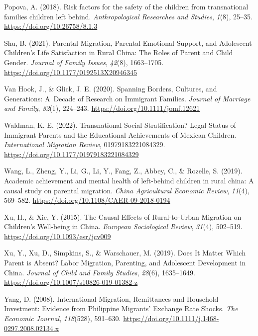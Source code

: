 \documentclass[
  man,floatsintext]{apa7}
\newlength{\cslhangindent}
\newlength{\cslentryspacingunit} %
\newenvironment{CSLReferences}[2] %
 {%
  \setlength{\parindent}{0pt}
  \ifodd #1
  \let\oldpar\par
  \def\par{\hangindent=\cslhangindent\oldpar}
  \fi
  \setlength{\parskip}{#2\cslentryspacingunit}
 }%
 {}
\begin{document}
\begin{CSLReferences}{1}{0}
\leavevmode{}%
Popova, A. (2018). Risk factors for the safety of the children from transnational families children left behind. \emph{Anthropological Researches and Studies}, \emph{1}(8), 25--35. \url{https://doi.org/10.26758/8.1.3}

\leavevmode{}%
Shu, B. (2021). Parental Migration, Parental Emotional Support, and Adolescent Children{'}s Life Satisfaction in Rural China: The Roles of Parent and Child Gender. \emph{Journal of Family Issues}, \emph{42}(8), 1663--1705. \url{https://doi.org/10.1177/0192513X20946345}

\leavevmode{}%
Van Hook, J., \& Glick, J. E. (2020). Spanning Borders, Cultures, and Generations: A~Decade of Research on Immigrant Families. \emph{Journal of Marriage and Family}, \emph{82}(1), 224--243. \url{https://doi.org/10.1111/jomf.12621}

\leavevmode{}%
Waldman, K. E. (2022). Transnational Social Stratification? Legal Status of Immigrant Parents and the Educational Achievements of Mexican Children. \emph{International Migration Review}, 01979183221084329. \url{https://doi.org/10.1177/01979183221084329}

\leavevmode{}%
Wang, L., Zheng, Y., Li, G., Li, Y., Fang, Z., Abbey, C., \& Rozelle, S. (2019). Academic achievement and mental health of left-behind children in rural china: A causal study on parental migration. \emph{China Agricultural Economic Review}, \emph{11}(4), 569--582. \url{https://doi.org/10.1108/CAER-09-2018-0194}

\leavevmode{}%
Xu, H., \& Xie, Y. (2015). The Causal Effects of Rural-to-Urban Migration on Children{'}s Well-being in China. \emph{European Sociological Review}, \emph{31}(4), 502--519. \url{https://doi.org/10.1093/esr/jcv009}

\leavevmode{}%
Xu, Y., Xu, D., Simpkins, S., \& Warschauer, M. (2019). Does It Matter Which Parent is Absent? Labor Migration, Parenting, and Adolescent Development in China. \emph{Journal of Child and Family Studies}, \emph{28}(6), 1635--1649. \url{https://doi.org/10.1007/s10826-019-01382-z}

\leavevmode{}%
Yang, D. (2008). International Migration, Remittances and Household Investment: Evidence from Philippine Migrants{'} Exchange Rate Shocks. \emph{The Economic Journal}, \emph{118}(528), 591--630. \url{https://doi.org/10.1111/j.1468-0297.2008.02134.x}


\end{CSLReferences}
\end{document}

